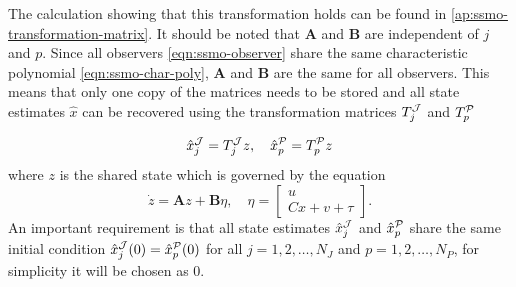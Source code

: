 The calculation showing that this transformation holds can be found in \autoref{ap:ssmo-transformation-matrix}. It should be noted that $\mathbf{A}$ and $\mathbf{B}$ are independent of $j$ and $p$. Since all observers \eqref{eqn:ssmo-observer} share the same characteristic polynomial \eqref{eqn:ssmo-char-poly}, $\mathbf{A}$ and $\mathbf{B}$ are the same for all observers. This means that only one copy of the matrices needs to be stored and all state estimates $\hat{x}$ can be recovered using the transformation matrices $T^{\mathcal{J}}_{j}$ and $T^{\mathcal{P}}_{p}$

\begin{equation*}
    \hat{x}_{j}^{\mathcal{J}} = T_{j}^{\mathcal{J}} z, \quad \hat{x}_{p}^{\mathcal{P}} = T_{p}^{\mathcal{P}} z
\end{equation*}
where $z$ is the shared state which is governed by the equation
\begin{equation}\label{eqn:ssmo-z}
    \dot{z} = \mathbf{A}z + \mathbf{B}\eta, \quad \eta = 
    \begin{bmatrix}
        u \\ Cx + v + \tau
    \end{bmatrix}.
\end{equation}
An important requirement is that all state estimates $\hat{x}^{\mathcal{J}}_{j}$ and $\hat{x}^{\mathcal{P}}_p$ share the same initial condition $\hat{x}^{\mathcal{J}}_{j}(0)=\hat{x}^{\mathcal{P}}_p(0)$ for all $j=1,2,\dots,N_J$ and $p=1,2,\dots,N_P$, for simplicity it will be chosen as $0$.

